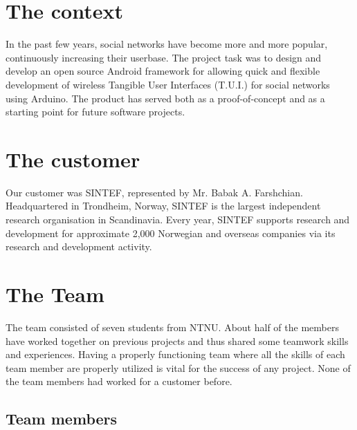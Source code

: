 \section{The context}
In the past few years, social networks have become more and more popular, continuously increasing their userbase.
The project task was to design and develop an open source Android\cite{link:android} framework for allowing quick and flexible
development of wireless Tangible User Interfaces (T.U.I.) for social networks using Arduino.
The product has served both as a proof-of-concept and as a starting point for future software projects.

\section{The customer}
Our customer was SINTEF, represented by Mr. Babak A. Farshchian.
Headquartered in Trondheim, Norway, SINTEF is the largest independent research organisation in Scandinavia.
Every year, SINTEF supports research and development for approximate 2,000 Norwegian and overseas
companies via its research and development activity.

\section{The Team}
The team consisted of seven students from NTNU. About half of the members have worked
together on previous projects and thus shared some teamwork skills and experiences.
Having a properly functioning team where all the skills of each team member are properly
utilized is vital for the success of any project. None of the team members had 
worked for a customer before.

\subsection{Team members}

